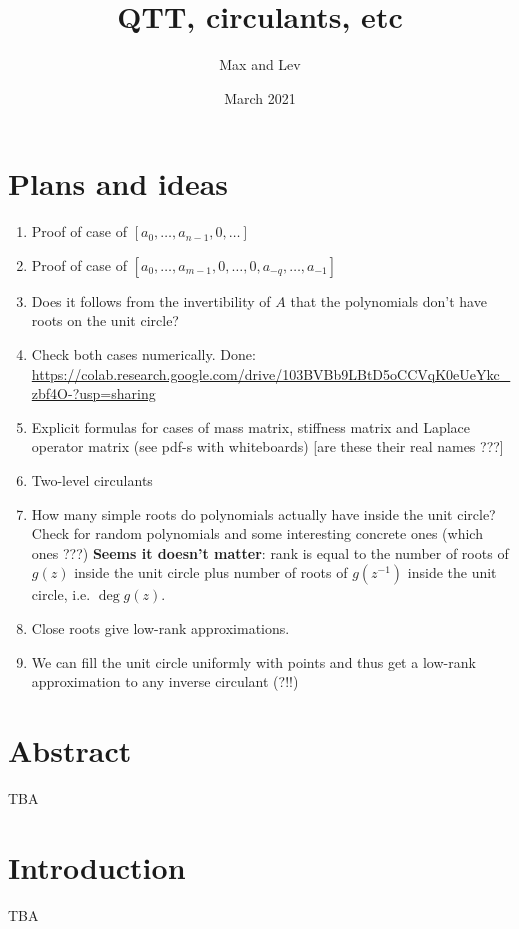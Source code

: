 \documentclass{article}
\title{QTT, circulants, etc}
\author{Max and Lev}
\date{March 2021}
\begin{document}
	
	\maketitle
	
		\section{Plans and ideas}
	\begin{enumerate}
		\item Proof of case of $[a_0, \dots, a_{n-1}, 0, \dots]$
		\item Proof of case of $[a_0, \dots, a_{m-1}, 0, \dots, 0, a_{-q}, \dots, a_{-1}]$
		\item Does it follows from the invertibility of $A$ that the polynomials don't have roots on the unit circle?
		\item Check both cases numerically. Done: \url{https://colab.research.google.com/drive/103BVBb9LBtD5oCCVqK0eUeYkc_zbf4O-?usp=sharing}
		\item Explicit formulas for cases of mass matrix, stiffness matrix and Laplace operator matrix (see pdf-s with whiteboards) [are these their real names ???]
		\item Two-level circulants
		\item How many simple roots do polynomials actually have inside the unit circle?
		Check for random polynomials and some interesting concrete ones (which ones ???) 
		\textbf{Seems it doesn't matter}: rank is equal to the number of roots of $g(z)$ inside the unit circle plus number of roots of $g(z^{-1})$ inside the unit circle, i.e. $\deg g(z)$.
		\item Close roots give low-rank approximations.
		\item We can fill the unit circle uniformly with points and thus get a low-rank approximation to any inverse circulant (?!!) 
	\end{enumerate}
	
	\section{Abstract}
	
	TBA
	
	\section{Introduction}
	
	TBA 
	
\end{document}
